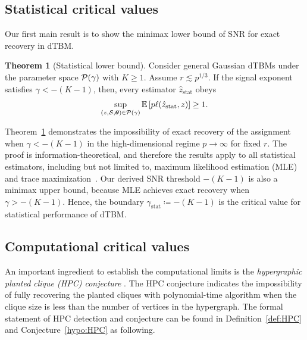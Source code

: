 \documentclass[lettersize,journal]{IEEEtran}
\theoremstyle{definition}
\newtheorem{thm}{Theorem}
\theoremstyle{definition}
\def\fixme#1#2{\textbf{\color{red}[FIXME (#1): #2]}}
\begin{document}
\subsection{Statistical critical values}\label{sec:statlimit}
Our first main result is to show the minimax lower bound of SNR for exact recovery in dTBM. 
\begin{thm}[Statistical lower bound]\label{thm:stats} Consider general Gaussian dTBMs under the parameter space $\mathcal{P}(\gamma)$ with $K\geq 1$. Assume $r \lesssim p^{1/3}$. If the signal exponent satisfies $\gamma < -(K-1)$, then, every estimator $\hat z_{\text{stat}}$ obeys
\begin{equation}
    \sup_{(z, \mathcal{S}, \boldsymbol{\theta}) \in \mathcal{P}(\gamma)} \mathbb{E} \left[ p\ell(\hat z_{\text{stat}}, z) \right]\geq 1.
\end{equation}
\end{thm}
Theorem~\ref{thm:stats} demonstrates the impossibility of exact recovery of the assignment when $\gamma < -(K-1)$ in the high-dimensional regime $p\to \infty$ for fixed $r$. The proof is information-theoretical, and therefore the results apply to all statistical estimators, including but not limited to, maximum likelihood estimation (MLE)~\citep{wang2019multiway,ke2019community} and trace maximization~\citep{ghoshdastidar2017uniform}. Our derived SNR threshold $-(K-1)$ is also a minimax upper bound, because MLE achieves exact recovery when $\gamma > -(K-1)$. Hence, the boundary $\gamma_{\text{stat}} \coloneqq -(K-1)$ is the  critical value for statistical performance of dTBM. 


\subsection{Computational critical values}\label{sec:complimit}
An important ingredient to establish the computational limits is the \emph{hypergraphic planted clique (HPC) conjecture} \citep{zhang2018tensor, brennan2020reducibility}. The HPC conjecture indicates the impossibility of fully recovering the planted cliques with polynomial-time algorithm when the clique size is less than the number of vertices in the hypergraph.
The formal statement of HPC detection and conjecture can be found in Definition~\ref{def:HPC} and Conjecture~\ref{hypo:HPC} as following.  
\end{document}
